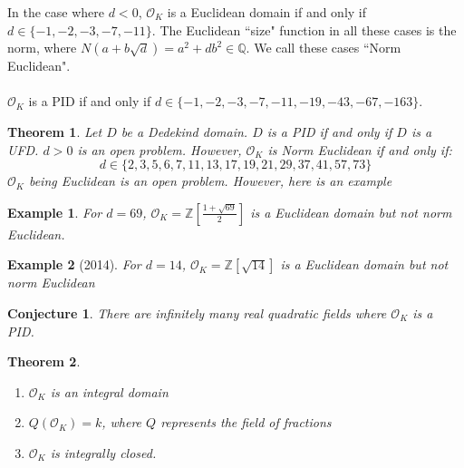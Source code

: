 \documentclass{article}
\newcommand{\air}{\mathcal{O}_K}
\newcommand{\Q}{\mathbb{Q}}
\newcommand{\Z}{\mathbb{Z}}
\newtheorem{theorem}{Theorem}[subsection]
\newtheorem{conj}{Conjecture}[subsection]
\newtheorem{example}{Example}[subsection]
\begin{document}
      \noindent In the case where $d<0$, $\air$ is a Euclidean domain if and only if $d\in\{-1,-2,-3,-7,-11\}$. The Euclidean ``size" function in all these cases is the norm, where $N(a+b\sqrt{d})=a^2+db^2\in\Q$. We call these cases ``Norm Euclidean".\\
      \\
      $\air$ is a PID if and only if $d\in\{-1,-2,-3,-7,-11,-19,-43,-67,-163\}$.
      \begin{theorem}
      Let $D$ be a Dedekind domain. $D$ is a PID if and only if $D$ is a UFD.
      $d>0$ is an open problem. However, $\air$ is Norm Euclidean if and only if:
      $$d\in \{2,3,5,6,7,11,13,17,19,21,29,37,41,57,73\}$$
      $\air$ being Euclidean is an open problem. However, here is an example
      \end{theorem}
      \begin{example}
      For $d=69$, $\air=\Z\left[\frac{1+\sqrt{69}}{2}\right]$ is a Euclidean domain but not norm Euclidean. 
      \end{example}
      \begin{example}[2014]
      For $d=14$, $\air=\Z[\sqrt{14}]$ is a Euclidean domain but not norm Euclidean
      \end{example}
\begin{conj}
There are infinitely many real quadratic fields where $\air$ is a PID.
\end{conj}
\begin{theorem}
\begin{enumerate}
    \item $\air$ is an integral domain
    \item $Q(\air)=k$, where $Q$ represents the field of fractions
    \item $\air$ is integrally closed.
\end{enumerate}
\end{theorem}
\end{document}
